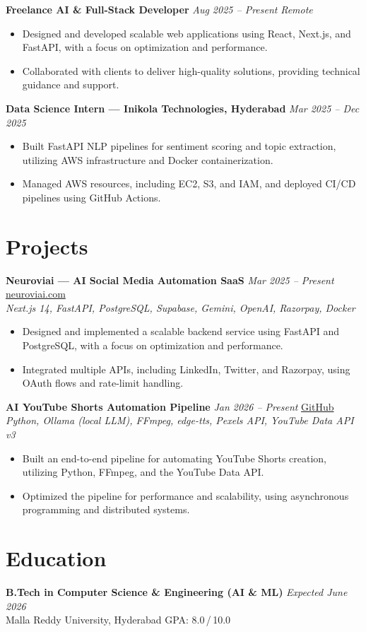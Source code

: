 \documentclass[9.5pt]{article}
\begin{document}
\textbf{Freelance AI \& Full-Stack Developer} \hfill \textit{Aug 2025 -- Present} \quad \textit{Remote}
\begin{itemize}
  \item Designed and developed scalable web applications using React, Next.js, and FastAPI, with a focus on optimization and performance.
  \item Collaborated with clients to deliver high-quality solutions, providing technical guidance and support.
\end{itemize}

\vspace{1.5pt}
\textbf{Data Science Intern --- Inikola Technologies, Hyderabad} \hfill \textit{Mar 2025 -- Dec 2025}
\begin{itemize}
  \item Built FastAPI NLP pipelines for sentiment scoring and topic extraction, utilizing AWS infrastructure and Docker containerization.
  \item Managed AWS resources, including EC2, S3, and IAM, and deployed CI/CD pipelines using GitHub Actions.
\end{itemize}

\section*{Projects}

\textbf{Neuroviai --- AI Social Media Automation SaaS} \hfill \textit{Mar 2025 -- Present} \quad \href{https://neuroviai.com}{neuroviai.com}\\
\textit{Next.js 14, FastAPI, PostgreSQL, Supabase, Gemini, OpenAI, Razorpay, Docker}
\begin{itemize}
  \item Designed and implemented a scalable backend service using FastAPI and PostgreSQL, with a focus on optimization and performance.
  \item Integrated multiple APIs, including LinkedIn, Twitter, and Razorpay, using OAuth flows and rate-limit handling.
\end{itemize}

\vspace{1.5pt}
\textbf{AI YouTube Shorts Automation Pipeline} \hfill \textit{Jan 2026 -- Present} \quad \href{https://github.com/JeetInTech/Youtube-shorts-Automation}{GitHub}\\
\textit{Python, Ollama (local LLM), FFmpeg, edge-tts, Pexels API, YouTube Data API v3}
\begin{itemize}
  \item Built an end-to-end pipeline for automating YouTube Shorts creation, utilizing Python, FFmpeg, and the YouTube Data API.
  \item Optimized the pipeline for performance and scalability, using asynchronous programming and distributed systems.
\end{itemize}

\section*{Education}
\textbf{B.Tech in Computer Science \& Engineering (AI \& ML)} \hfill \textit{Expected June 2026}\\
Malla Reddy University, Hyderabad \hfill GPA: 8.0\,/\,10.0
\end{document}
